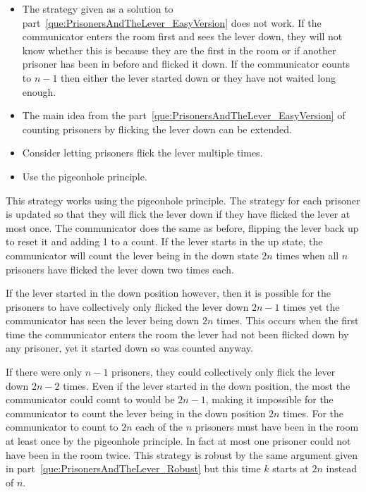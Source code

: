\begin{parts}
	\begin{hints}
		\begin{itemize}
			\item The strategy given as a solution to part~\ref{que:PrisonersAndTheLever_EasyVersion} does not work. If the communicator enters the room first and sees the lever down, they will not know whether this is because they are the first in the room or if another prisoner has been in before and flicked it down. If the communicator counts to $n - 1$ then either the lever started down or they have not waited long enough.
			\item The main idea from the part~\ref{que:PrisonersAndTheLever_EasyVersion} of counting prisoners by flicking the lever down can be extended.
			\item Consider letting prisoners flick the lever multiple times.
			\item Use the pigeonhole principle.
		\end{itemize}
	\end{hints}
	
	\begin{solution}
		
		This strategy works using the pigeonhole principle. The strategy for each prisoner is updated so that they will flick the lever down if they have flicked the lever at most once. The communicator does the same as before, flipping the lever back up to reset it and adding 1 to a count. If the lever starts in the up state, the communicator will count the lever being in the down state $2n$ times when all $n$ prisoners have flicked the lever down two times each.
		
		If the lever started in the down position however, then it is possible for the prisoners to have collectively only flicked the lever down $2n - 1$ times yet the communicator has seen the lever being down $2n$ times. This occurs when the first time the communicator enters the room the lever had not been flicked down by any prisoner, yet it started down so was counted anyway.
		
		If there were only $n - 1$ prisoners, they could collectively only flick the lever down $2n - 2$ times. Even if the lever started in the down position, the most the communicator could count to would be $2n - 1$, making it impossible for the communicator to count the lever being in the down position $2n$ times. For the communicator to count to $2n$ each of the $n$ prisoners must have been in the room at least once by the pigeonhole principle. In fact at most one prisoner could not have been in the room twice. This strategy is robust by the same argument given in part~\ref{que:PrisonersAndTheLever_Robust} but this time $k$ starts at $2n$ instead of $n$.
		

\end{solution}
\end{parts}

